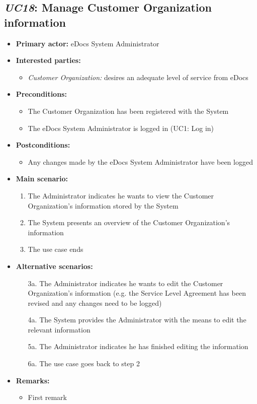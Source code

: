\documentclass[a4paper,10pt]{article}
\begin{document}
\subsection{\emph{UC18}: Manage Customer Organization information}
\begin{itemize}
	\item \textbf{Primary actor:} eDocs System Administrator
	\item \textbf{Interested parties:} 
	\begin{itemize}
		\item \textit{Customer Organization:} desires an adequate level of service from eDocs
	\end{itemize}
	
	\item \textbf{Preconditions:}
	\begin{itemize}
		\item The Customer Organization has been registered with the System
		\item The eDocs System Administrator is logged in (UC1: Log in)
	\end{itemize}
	
	\item \textbf{Postconditions:}
	\begin{itemize}
		\item Any changes made by the eDocs System Administrator have been logged
	\end{itemize}
	
	\item \textbf{Main scenario:} 
	\begin{enumerate}
		\item The Administrator indicates he wants to view the Customer Organization's information stored by the System
		\item The System presents an overview of the Customer Organization's information
		\item The use case ends
	\end{enumerate}
	
	\item \textbf{Alternative scenarios:} 
	\begin{enumerate}
		\item [3a.] The Administrator indicates he wants to edit the Customer Organization's information (e.g. the Service Level Agreement has been revised and any changes need to be logged)
		\item [4a.] The System provides the Administrator with the means to edit the relevant information
		\item [5a.] The Administrator indicates he has finished editing the information
		\item [6a.] The use case goes back to step 2
	\end{enumerate}
	
	\item \textbf{Remarks:}
	\begin{itemize}
		\item First remark
	\end{itemize}
\end{itemize}
\end{document}
